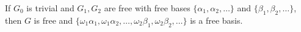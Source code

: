 If $G_0$ is trivial and $G_1, G_2$ are free with free bases $\{\alpha_1, \alpha_2, \ldots\}$ and $\{\beta_1, \beta_2, \ldots\}$, then $G$ is free and $\{\omega_1\alpha_1, \omega_1\alpha_2, \ldots, \omega_2\beta_1, \omega_2\beta_2, \ldots\}$ is a free basis.

